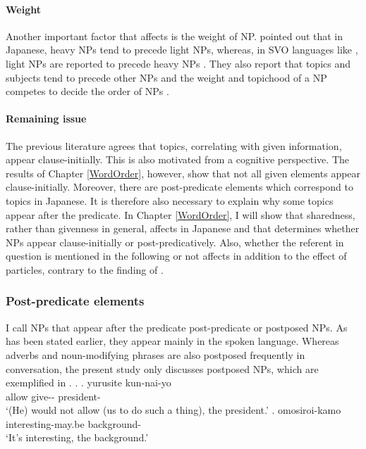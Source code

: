 \paragraph{Weight}

Another important factor that affects  is the weight of NP.
 pointed out that
in Japanese,
heavy NPs tend to precede light NPs,
whereas, in SVO languages like ,
light NPs are reported to precede heavy NPs \cite[e.g.,][]{arnoldetal00}.
They also report that topics and subjects tend to precede other NPs
and the weight and topichood of a NP competes to decide the order of NPs \cite[see also][]{kondoyamashita07}.


\paragraph{Remaining issue}

The previous literature agrees that topics,
correlating with given information, appear clause-initially.
This is also motivated from a cognitive perspective.
The results of Chapter \ref{WordOrder}, however, show that
not all given elements appear clause-initially.
Moreover, there are post-predicate elements which correspond to topics in Japanese.
It is therefore also necessary to explain why some topics appear after the predicate.
In Chapter \ref{WordOrder},
I will show that sharedness,
rather than givenness in general,
affects  in Japanese and that
 determines whether
NPs appear clause-initially or post-predicatively.
Also, whether the referent in question is mentioned in the following  or not affects  in addition to the effect of particles,
contrary to the finding of .

\subsubsection{Post-predicate elements}\label{Back:CharJ:WO:PostP}

I call NPs that appear after the predicate post-predicate or postposed NPs.
As has been stated earlier,
they appear mainly in the spoken language.
Whereas adverbs and noun-modifying phrases are also postposed frequently in conversation,
the present study only discusses postposed NPs,
which are exemplified in \Next.
%
\ex.
 \ag. yurusite kun-nai-yo  \\
      allow give-- president- \\
      `(He) would not allow (us to do such a thing), the president.'
      \hfill{\cite[431]{onosuzuki92}}
 \bg. omosiroi-kamo  \\
      interesting-may.be background- \\
      `It's interesting, the background.'
      \hfill{\cite[9]{nakagawaetal08_paper}}


